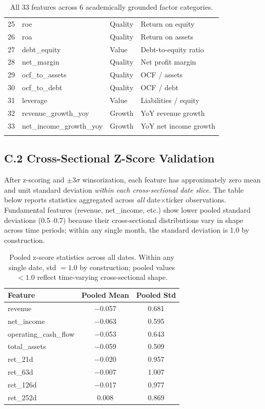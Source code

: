 \documentclass[11pt, a4paper]{article}
\begin{document}
\begin{longtable}{clll}
25 & roe & Quality & Return on equity \\
26 & roa & Quality & Return on assets \\
27 & debt\_equity & Value & Debt-to-equity ratio \\
28 & net\_margin & Quality & Net profit margin \\
29 & ocf\_to\_assets & Quality & OCF / assets \\
30 & ocf\_to\_debt & Quality & OCF / debt \\
31 & leverage & Value & Liabilities / equity \\
32 & revenue\_growth\_yoy & Growth & YoY revenue growth \\
33 & net\_income\_growth\_yoy & Growth & YoY net income growth \\
\bottomrule
\caption{All 33 features across 6 academically grounded factor categories.}
\end{longtable}
\normalsize

\subsection*{C.2 Cross-Sectional Z-Score Validation}
After z-scoring and $\pm 3\sigma$ winsorization, each feature has approximately zero mean and unit standard deviation \emph{within each cross-sectional date slice}. The table below reports statistics aggregated across \emph{all} date$\times$ticker observations. Fundamental features (revenue, net\_income, etc.) show lower pooled standard deviations (0.5--0.7) because their cross-sectional distributions vary in shape across time periods; within any single month, the standard deviation is 1.0 by construction.

\begin{table}[h]
\centering
\begin{tabular}{lcc}
\toprule
\textbf{Feature} & \textbf{Pooled Mean} & \textbf{Pooled Std} \\
\midrule
revenue & $-$0.057 & 0.681 \\
net\_income & $-$0.063 & 0.595 \\
operating\_cash\_flow & $-$0.053 & 0.643 \\
total\_assets & $-$0.059 & 0.509 \\
ret\_21d & $-$0.020 & 0.957 \\
ret\_63d & $-$0.007 & 1.007 \\
ret\_126d & $-$0.017 & 0.977 \\
ret\_252d & 0.008 & 0.869 \\
\bottomrule
\end{tabular}
\caption{Pooled z-score statistics across all dates. Within any single date, std $= 1.0$ by construction; pooled values $< 1.0$ reflect time-varying cross-sectional shape.}
\end{table}
\end{document}
